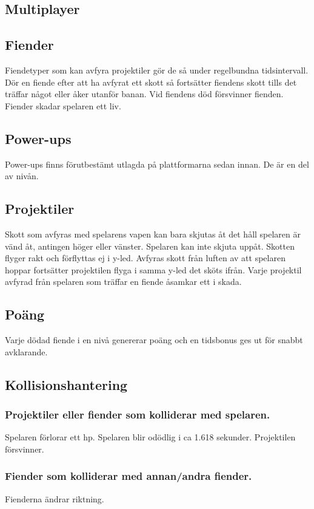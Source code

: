 \documentclass{TDP005mall}
\begin{document}
\subsection{Multiplayer} %


\subsection{Fiender}
Fiendetyper som kan avfyra projektiler gör de så under regelbundna tidsintervall. Dör en fiende efter att ha avfyrat ett skott så fortsätter fiendens skott tills det träffar något eller åker utanför banan. Vid fiendens död försvinner fienden. Fiender skadar spelaren ett liv.

\subsection{Power-ups}
Power-ups finns förutbestämt utlagda på plattformarna sedan innan. De är en del av nivån.

\subsection{Projektiler}
Skott som avfyras med spelarens vapen kan bara skjutas åt det håll spelaren är vänd åt, antingen höger eller vänster. Spelaren kan inte skjuta uppåt. Skotten flyger rakt och förflyttas ej i y-led. Avfyras skott från luften av att spelaren hoppar fortsätter projektilen flyga i samma y-led det sköts ifrån. Varje projektil avfyrad från spelaren som träffar en fiende åsamkar ett i skada.

\subsection{Poäng}
Varje dödad fiende i en nivå genererar poäng och en tidsbonus ges ut för snabbt avklarande. 

\subsection{Kollisionshantering}
\subsubsection{Projektiler eller fiender som kolliderar med spelaren.}
Spelaren förlorar ett hp. Spelaren blir odödlig i ca 1.618 sekunder. Projektilen försvinner.

\subsubsection{Fiender som kolliderar med annan/andra fiender.}
Fienderna ändrar riktning.
\end{document}
